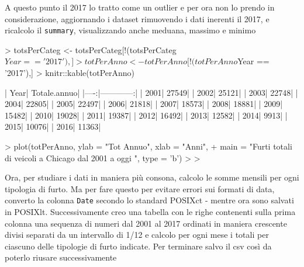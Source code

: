 \documentclass{article}
\begin{document}
A questo punto il 2017 lo tratto come un outlier e per ora non lo prendo in considerazione, aggiornando i dataset rimuovendo i dati inerenti il 2017, e ricalcolo il \texttt{summary}, visualizzando anche meduana, massimo e minimo
\begin{Schunk}
\begin{Sinput}
> totsPerCateg <- totsPerCateg[!(totsPerCateg$Year == '2017'),]
> totPerAnno <- totPerAnno[!(totPerAnno$Year == '2017'),]
> knitr::kable(totPerAnno)
\end{Sinput}
\begin{Soutput}
| Year| Totale.annuo|
|----:|------------:|
| 2001|        27549|
| 2002|        25121|
| 2003|        22748|
| 2004|        22805|
| 2005|        22497|
| 2006|        21818|
| 2007|        18573|
| 2008|        18881|
| 2009|        15482|
| 2010|        19028|
| 2011|        19387|
| 2012|        16492|
| 2013|        12582|
| 2014|         9913|
| 2015|        10076|
| 2016|        11363|
\end{Soutput}
\begin{Sinput}
> plot(totPerAnno, ylab = "Tot Annuo", xlab = "Anni", 
+      main = "Furti totali di veicoli a Chicago dal 2001 a oggi ", type = 'b')
> 
> 
\end{Sinput}
\end{Schunk}
Ora, per studiare i dati in maniera più consona, calcolo le somme mensili per ogni tipologia di furto.
Ma per fare questo per evitare errori sui formati di data, converto la colonna \texttt{Date} secondo lo standard POSIXct - mentre ora sono salvati in POSIXlt.
Successivamente creo una tabella con le righe contenenti sulla prima colonna una sequenza di numeri dal 2001 al 2017 ordinati in maniera crescente divisi separati da un intervallo di 1/12 e calcolo per ogni mese i totali per ciascuno delle tipologie di furto indicate.
Per terminare salvo il csv così da poterlo riusare successivamente
\end{document}

